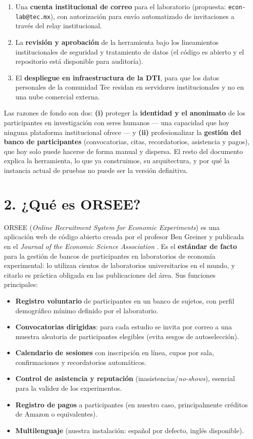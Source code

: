 \documentclass[11pt,letterpaper]{article}
\newcommand{\seccion}[1]{\section*{\color{tecblue}#1}}
\begin{document}
\begin{enumerate}[leftmargin=2em]
    \item Una \textbf{cuenta institucional de correo} para el laboratorio (propuesta:
    \texttt{econ-lab@tec.mx}), con autorización para envío automatizado de invitaciones
    a través del relay institucional.
    \item La \textbf{revisión y aprobación} de la herramienta bajo los lineamientos
    institucionales de seguridad y tratamiento de datos (el código es abierto y el
    repositorio está disponible para auditoría).
    \item El \textbf{despliegue en infraestructura de la DTI}, para que los datos personales
    de la comunidad Tec residan en servidores institucionales y no en una nube comercial
    externa.
\end{enumerate}

Las razones de fondo son dos: \textbf{(i)} proteger la \textbf{identidad y el anonimato} de los
participantes en investigación con seres humanos --- una capacidad que hoy ninguna
plataforma institucional ofrece --- y \textbf{(ii)} profesionalizar la \textbf{gestión del banco
de participantes} (convocatorias, citas, recordatorios, asistencia y pagos), que hoy solo
puede hacerse de forma manual y dispersa. El resto del documento explica la herramienta,
lo que ya construimos, su arquitectura, y por qué la instancia actual de pruebas no puede
ser la versión definitiva.

\seccion{2. ¿Qué es ORSEE?}

ORSEE (\emph{Online Recruitment System for Economic Experiments}) es una aplicación web de
código abierto creada por el profesor Ben Greiner y publicada en el \emph{Journal of the
Economic Science Association} \cite{greiner2015}. Es el \textbf{estándar de facto} para la
gestión de bancos de participantes en laboratorios de economía experimental: lo utilizan
cientos de laboratorios universitarios en el mundo, y citarlo es práctica obligada en las
publicaciones del área. Sus funciones principales:

\begin{itemize}[leftmargin=2em]
    \item \textbf{Registro voluntario} de participantes en un banco de sujetos, con perfil
    demográfico mínimo definido por el laboratorio.
    \item \textbf{Convocatorias dirigidas}: para cada estudio se invita por correo a una
    muestra aleatoria de participantes elegibles (evita sesgos de autoselección).
    \item \textbf{Calendario de sesiones} con inscripción en línea, cupos por sala,
    confirmaciones y recordatorios automáticos.
    \item \textbf{Control de asistencia y reputación} (inasistencias/\emph{no-shows}),
    esencial para la validez de los experimentos.
    \item \textbf{Registro de pagos} a participantes (en nuestro caso, principalmente
    créditos de Amazon o equivalentes).
    \item \textbf{Multilenguaje} (nuestra instalación: español por defecto, inglés disponible).
\end{itemize}
\end{document}
